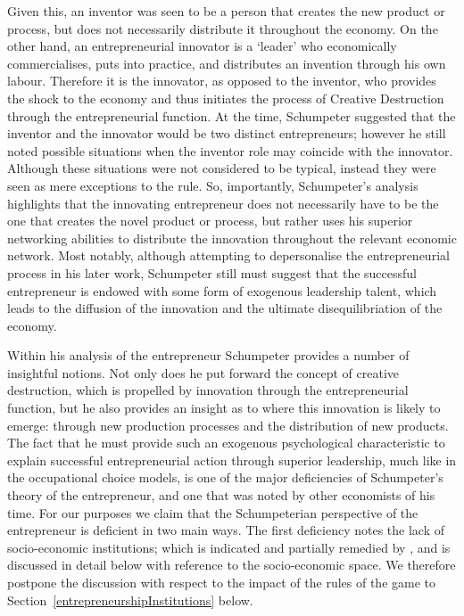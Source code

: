 Given this, an inventor was seen to be a person that creates the new product or process, but does not necessarily distribute it throughout the economy. On the other hand, an entrepreneurial innovator is a `leader' who economically commercialises, puts into practice, and distributes an invention through his own labour. Therefore it is the innovator, as opposed to the inventor, who provides the shock to the economy and thus initiates the process of Creative Destruction through the entrepreneurial function. At the time, Schumpeter suggested that the inventor and the innovator would be two distinct entrepreneurs; however he still noted possible situations when the inventor role may coincide with the innovator. Although these situations were not considered to be typical, instead they were seen as mere exceptions to the rule. So, importantly, Schumpeter's analysis highlights that the innovating entrepreneur does not necessarily have to be the one that creates the novel product or process, but rather uses his superior networking abilities to distribute the innovation throughout the relevant economic network. Most notably, although attempting to depersonalise the entrepreneurial process in his later work, Schumpeter still must suggest that the successful entrepreneur is endowed with some form of exogenous leadership talent, which leads to the diffusion of the innovation and the ultimate disequilibriation of the economy.

Within his analysis of the entrepreneur Schumpeter provides a number of insightful notions. Not only does he put forward the concept of creative destruction, which is propelled by innovation through the entrepreneurial function, but he also provides an insight as to where this innovation is likely to emerge: through new production processes and the distribution of new products. The fact that he must provide such an exogenous psychological characteristic to explain successful entrepreneurial action through superior leadership, much like in the occupational choice models, is one of the major deficiencies of Schumpeter's theory of the entrepreneur, and one that was noted by other economists of his time. For our purposes we claim that the Schumpeterian perspective of the entrepreneur is deficient in two main ways. The first deficiency notes the lack of socio-economic institutions; which is indicated and partially remedied by \citet{Baumol1990}, and is discussed in detail below with reference to the socio-economic space. We therefore postpone the discussion with respect to the impact of the rules of the game to Section~\ref{entrepreneurshipInstitutions} below. 

